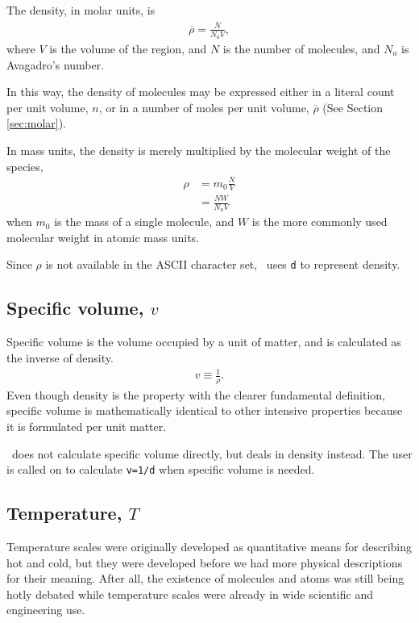The density, in molar units, is
\begin{align}
\overline{\rho} = \frac{\overline{N}}{N_a V},
\end{align}
where $V$ is the volume of the region, and $N$ is the number of molecules, and $N_a$ is Avagadro's number.  

In this way, the density of molecules may be expressed either in a literal count per unit volume, $n$, or in a number of moles per unit volume, $\overline{\rho}$ (See Section \ref{sec:molar}).  

In mass units, the density is merely multiplied by the molecular weight of the species,
\begin{align}
\rho &= m_0 \frac{N}{V}\\
 &= \frac{N W}{N_a V}\nonumber
\end{align}
when $m_0$ is the mass of a single molecule, and $W$ is the more commonly used molecular weight in atomic mass units.

Since $\rho$ is not available in the ASCII character set, \PM\ uses \verb|d| to represent density.

\subsection{Specific volume, $v$}

Specific volume is the volume occupied by a unit of matter, and is calculated as the inverse of density.
\begin{align}
v \equiv \frac{1}{\rho}.
\end{align}
Even though density is the property with the clearer fundamental definition, specific volume is mathematically identical to other intensive properties because it is formulated per unit matter.

\PM\ does not calculate specific volume directly, but deals in density instead.  The user is called on to calculate \verb|v=1/d| when specific volume is needed.

\subsection{Temperature, $T$}

Temperature scales were originally developed as quantitative means for describing hot and cold, but they were developed before we had more physical descriptions for their meaning.  After all, the existence of molecules and atoms was still being hotly debated while temperature scales were already in wide scientific and engineering use.

